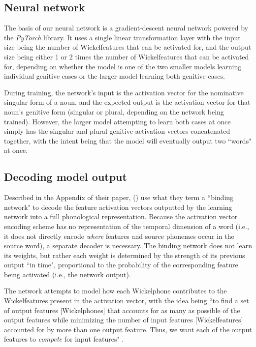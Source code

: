 \documentclass[11pt,a4paper]{article}
\newcommand{\citenp}[1]{\citeauthor{#1} (\citeyear{#1})}
\begin{document}
\subsection{Neural network}

The basis of our neural network is a gradient-descent neural network powered by the
\emph{PyTorch} library. It uses a single linear transformation layer with the
input size being the number of Wickelfeatures that can be activated for,
and the output size being either 1 or 2 times the number of Wickelfeatures
that can be activated for, depending on whether the model is one of the
two smaller models learning individual genitive cases or the larger model
learning both genitive cases.

During training, the network's input is the activation vector for the nominative singular form
of a noun, and the expected output is the activation vector for that noun's genitive form
(singular or plural, depending on the network being trained). However, the larger model attempting
to learn both cases at once simply has the singular and plural genitive activation vectors concatenated together,
with the intent being that the model will eventually output two ``words" at once.

\subsection{Decoding model output}
Described in the Appendix of their paper, \citenp{RMcC} use what they term a ``binding network" to decode the feature activation vectors
outputted by the learning network into a full phonological representation. Because the activation
vector encoding scheme has no representation of the temporal dimension of a word (i.e., it does
not directly encode \textit{where} features and source phonemes occur in the source word), a separate
decoder is necessary. The binding network does not learn its weights, but rather each weight is determined
by the strength of its previous output ``in time", proportional to the probability of the corresponding feature
being activated (i.e., the network output).

The network attempts to model how each Wickelphone contributes to the Wickelfeatures present in the activation
vector, with the idea being ``to find a set of output features [Wickelphones] that accounts for as many as possible of the output features while minimizing the number of input features [Wickelfeatures] accounted for by more than one output feature. Thus, we want each of the output features to \textit{compete} for input features" \cite[pp. 269]{RMcC}.
\end{document}
